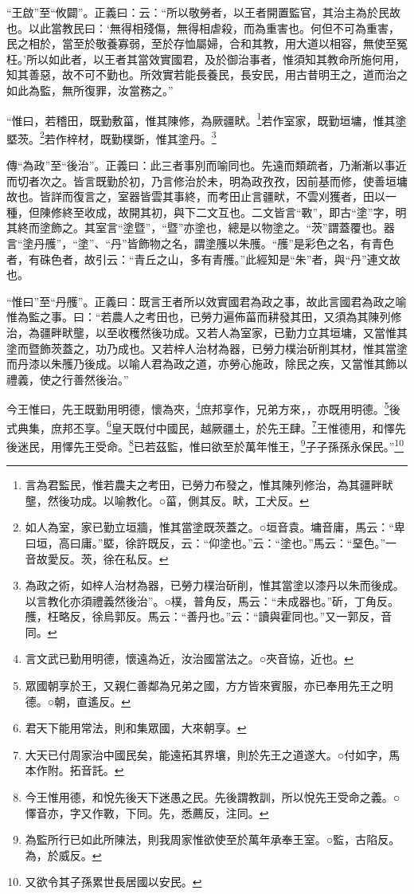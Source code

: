 {\noindent\shu{}\fzkt “王啟”至“攸闢”。正義曰：云：“所以敬勞者，以王者開置監官，其治主為於民故也。以此當教民曰：‘無得相殘傷，無得相虐殺，而為重害也。何但不可為重害，民之相於，當至於敬養寡弱，至於存恤屬婦，合和其教，用大道以相容，無使至冤枉。’所以如此者，以王者其當效實國君，及於御治事者，惟須知其教命所施何用，知其善惡，故不可不勤也。所效實若能長養民，長安民，用古昔明王之，道而治之如此為監，無所復罪，汝當務之。” \par}

“惟曰，若稽田，既勤敷菑，惟其陳修，為厥疆畎。\footnote{言為君監民，惟若農夫之考田，已勞力布發之，惟其陳列修治，為其疆畔畎壟，然後功成。以喻教化。○菑，側其反。畎，工犬反。}若作室家，既勤垣墉，惟其塗塈茨。\footnote{如人為室，家已勤立垣牆，惟其當塗既茨蓋之。○垣音袁。墉音庸，馬云：“卑曰垣，高曰庸。”塈，徐許既反，云：“仰塗也。”云：“塗也。”馬云：“堊色。”一音故愛反。茨，徐在私反。}若作梓材，既勤樸斲，惟其塗丹。\footnote{為政之術，如梓人治材為器，已勞力樸治斫削，惟其當塗以漆丹以朱而後成。以言教化亦須禮義然後治”。○樸，普角反，馬云：“未成器也。”斫，丁角反。雘，枉略反，徐烏郭反。馬云：“善丹也。”云：“讀與霍同也。”又一郭反，音同。}


{\noindent\zhuan{}\fzbyks 傳“為政”至“後治”。正義曰：此三者事別而喻同也。先遠而類疏者，乃漸漸以事近而切者次之。皆言既勤於初，乃言修治於未，明為政孜孜，因前基而修，使善垣墉故也。皆詳而復言之，室器皆雲其事終，而考田止言疆畎，不雲刈獲者，田以一種，但陳修終至收成，故開其初，與下二文互也。二文皆言“斁”，即古“塗”字，明其終而塗飾之。其室言“塗暨”，“暨”亦塗也，總是以物塗之。“茨”謂蓋覆也。器言“塗丹雘”，“塗”、“丹”皆飾物之名，謂塗雘以朱雘。“雘”是彩色之名，有青色者，有硃色者，故引云：“青丘之山，多有青雘。”此經知是“朱”者，與“丹”連文故也。 \par}

{\noindent\shu{}\fzkt “惟曰”至“丹雘”。正義曰：既言王者所以效實國君為政之事，故此言國君為政之喻惟為監之事。曰：“若農人之考田也，已勞力遍佈菑而耕發其田，又須為其陳列修治，為疆畔畎壟，以至收穫然後功成。又若人為室家，已勤力立其垣墉，又當惟其塗而暨飾茨蓋之，功乃成也。又若梓人治材為器，已勞力樸治斫削其材，惟其當塗而丹漆以朱雘乃後成。以喻人君為政之道，亦勞心施政，除民之疾，又當惟其飾以禮義，使之行善然後治。” \par}

今王惟曰，先王既勤用明德，懷為夾，\footnote{言文武已勤用明德，懷遠為近，汝治國當法之。○夾音協，近也。}庶邦享作，兄弟方來，，亦既用明德。\footnote{眾國朝享於王，又親仁善鄰為兄弟之國，方方皆來賓服，亦已奉用先王之明德。○朝，直遙反。}後式典集，庶邦丕享。\footnote{君天下能用常法，則和集眾國，大來朝享。}皇天既付中國民，越厥疆土，於先王肆。\footnote{大天已付周家治中國民矣，能遠拓其界壤，則於先王之道遂大。○付如字，馬本作附。拓音託。}王惟德用，和懌先後迷民，用懌先王受命。\footnote{今王惟用德，和悅先後天下迷愚之民。先後謂教訓，所以悅先王受命之義。○懌音亦，字又作斁，下同。先，悉薦反，注同。}已若茲監，惟曰欲至於萬年惟王，\footnote{為監所行已如此所陳法，則我周家惟欲使至於萬年承奉王室。○監，古陷反。為，於威反。}子子孫孫永保民。”\footnote{又欲令其子孫累世長居國以安民。}

